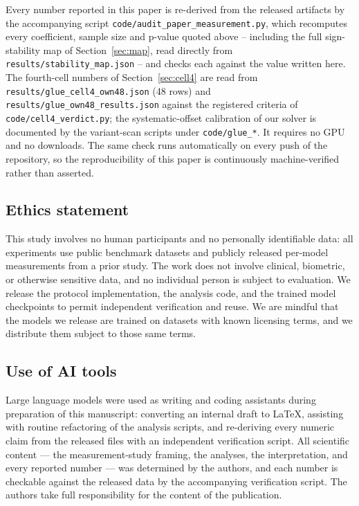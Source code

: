 \documentclass[10pt]{article}
\begin{document}
Every number reported in this paper is re-derived from the released artifacts by
the accompanying script \texttt{code/audit\_paper\_measurement.py}, which
recomputes every coefficient, sample size and p-value quoted above --
including the full sign-stability map of
Section~\ref{sec:map}, read directly from
\texttt{results/stability\_map.json} -- and checks each against the value
written here. The fourth-cell numbers of Section~\ref{sec:cell4} are read
from \texttt{results/glue\_cell4\_own48.json} (48 rows) and
\texttt{results/glue\_own48\_results.json} against the registered criteria
of \texttt{code/cell4\_verdict.py}; the systematic-offset calibration of our
solver is documented by the variant-scan scripts under
\texttt{code/glue\_*}.
It requires no GPU and no downloads. The same check runs automatically on every
push of the repository, so the reproducibility of this paper is continuously
machine-verified rather than asserted.

\subsection*{Ethics statement}

This study involves no human participants and no personally identifiable data:
all experiments use public benchmark datasets and publicly released per-model
measurements from a prior study. The work does not involve clinical, biometric,
or otherwise sensitive data, and no individual person is subject to evaluation.
We release the protocol implementation, the analysis code, and the trained model
checkpoints to permit independent verification and reuse. We are mindful that
the models we release are trained on datasets with known licensing terms, and we
distribute them subject to those same terms.

\subsection*{Use of AI tools}

Large language models were used as writing and coding assistants during
preparation of this manuscript: converting an internal draft to LaTeX,
assisting with routine refactoring of the analysis scripts, and re-deriving
every numeric claim from the released files with an independent verification
script. All scientific content --- the measurement-study framing, the
analyses, the interpretation, and every reported number --- was determined by
the authors, and each number is checkable against the released data by the
accompanying verification script. The authors take full responsibility for the
content of the publication.




\end{document}
